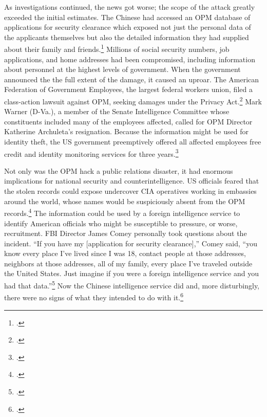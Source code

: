 \documentclass[11pt]{memoir}
\begin{document}
\begin{refsegment}
As investigations continued, the news got worse; the scope of the attack greatly exceeded the initial estimates. The Chinese had accessed an OPM database of applications for security clearance which exposed not just the personal data of the applicants themselves but also the detailed information they had supplied about their family and friends.\footcite{nakashima_hacks_2015} Millions of social security numbers, job applications, and home addresses had been compromised, including information about personnel at the highest levels of government. When the government announced the the full extent of the damage, it caused an uproar. The American Federation of Government Employees, the largest federal workers union, filed a class-action lawsuit against OPM, seeking damages under the Privacy Act.\footcite[The lawsuits were later dismissed.]{chalfant_court_2017} Mark Warner (D-Va.), a member of the Senate Intelligence Committee whose constituents included many of the employees affected, called for OPM Director Katherine Archuleta's resignation. Because the information might be used for identity theft, the US government preemptively offered all affected employees free credit and identity monitoring services for three years.\footcite{nakashima_hacks_2015}

Not only was the OPM hack a public relations disaster, it had enormous implications for national security and counterintelligence. US officials feared that the stolen records could expose undercover CIA operatives working in embassies around the world, whose names would be suspiciously absent from the OPM records.\footcite{nakashima_hacks_2015} The information could be used by a foreign intelligence service to identify American officials who might be susceptible to pressure, or worse, recruitment. FBI Director James Comey personally took questions about the incident. ``If you have my [application for security clearance],'' Comey said, ``you know every place I've lived since I was 18, contact people at those addresses, neighbors at those addresses, all of my family, every place I've traveled outside the United States. Just imagine if you were a foreign intelligence service and you had that data.''\footcite{nakashima_hacks_2015} Now the Chinese intelligence service did and, more disturbingly, there were no signs of what they intended to do with it.\footcite{koerner_inside_2016}


\end{refsegment}
\end{document}
